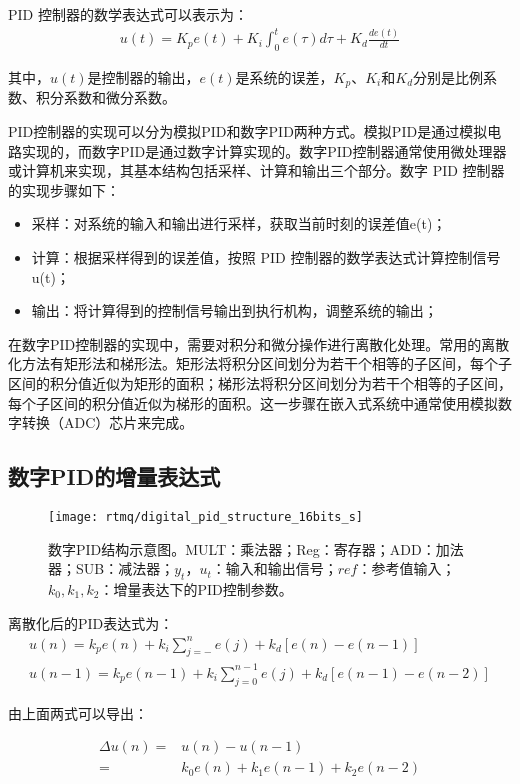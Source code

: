 PID 控制器的数学表达式可以表示为：
\begin{align}
    u(t)= K_p e(t) + K_i \int_{0}^{t} e(\tau) d\tau + K_d \frac{d e(t)}{dt}
\end{align}

其中，$u(t)$是控制器的输出，$e(t)$是系统的误差，$K_p$、$K_i$和$K_d$分别是比例系数、积分系数和微分系数。
 
PID控制器的实现可以分为模拟PID和数字PID两种方式。模拟PID是通过模拟电路实现的，而数字PID是通过数字计算实现的。数字PID控制器通常使用微处理器或计算机来实现，其基本结构包括采样、计算和输出三个部分。数字 PID 控制器的实现步骤如下：
\begin{itemize}
    \item 采样：对系统的输入和输出进行采样，获取当前时刻的误差值e(t)；
    \item 计算：根据采样得到的误差值，按照 PID 控制器的数学表达式计算控制信号u(t)；
    \item 输出：将计算得到的控制信号输出到执行机构，调整系统的输出；
\end{itemize}

在数字PID控制器的实现中，需要对积分和微分操作进行离散化处理。常用的离散化方法有矩形法和梯形法。矩形法将积分区间划分为若干个相等的子区间，每个子区间的积分值近似为矩形的面积；梯形法将积分区间划分为若干个相等的子区间，每个子区间的积分值近似为梯形的面积。这一步骤在嵌入式系统中通常使用模拟数字转换（ADC）芯片来完成。

\subsection[数字PID的增量表达式]{数字PID的增量表达式}
\begin{figure}
    \centering
    \caption[数字PID结构示意图]{数字PID结构示意图。MULT：乘法器；Reg：寄存器；ADD：加法器；SUB：减法器；$y_t，u_t$：输入和输出信号；$ref$：参考值输入；$k_0,k_1,k_2$：增量表达下的PID控制参数。\label{fig:digital_pid_structure_16bits_s}}
    \texttt{[image: rtmq/digital\_pid\_structure\_16bits\_s]}
\end{figure}

离散化后的PID表达式为：
\begin{align}
    u(n)=k_p e(n)+k_i\sum_{j=-}^{n}e(j)+k_d[e(n)-e(n-1)]\\
    u(n-1)=k_p e(n-1)+k_i \sum_{j=0}^{n-1}e(j)+k_d [e(n-1)-e(n-2)]
\end{align}

由上面两式可以导出：

\begin{align}
    \Delta u(n)=&u(n)-u(n-1)\\
    =&k_0 e(n)+k_1 e(n-1)+k_2 e(n-2)
\end{align}

